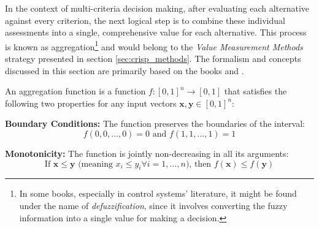 \label{sec:fuzzy_aggregation}









In the context of multi-criteria decision making, after evaluating each alternative against every criterion, the next logical step is to combine these individual assessments into a single, comprehensive value for each alternative. This process is known as aggregation\footnote{In some books, especially in control systems' literature, it might be found under the name of \textit{defuzzification}, since it involves converting the fuzzy information into a single value for making a decision.} and would belong to the \emph{Value Measurement Methods} strategy presented in section \ref{sec:crisp_methods}. The formalism and concepts discussed in this section are primarily based on the books \cite{beliakov2023discrete} and \cite{xu2015uncertain}.

\begin{definition} \label{def:aggregation_function}
An aggregation function is a function $f: [0, 1]^n \to [0, 1]$ that satisfies the following two properties for any input vectors $\mathbf{x}, \mathbf{y} \in [0, 1]^n$:
\begin{romanenum}
    \item \textbf{Boundary Conditions:} The function preserves the boundaries of the interval:
    \[f(0, 0, \dots, 0) = 0\text{ and }f(1, 1, \dots, 1) = 1\]
    \item \textbf{Monotonicity:} The function is jointly non-decreasing in all its arguments:
    \[\text{If }\mathbf{x} \le \mathbf{y}\text{ (meaning }x_i \le y_i \forall i=1, \dots, n\text{), then }f(\mathbf{x}) \le f(\mathbf{y})\]
\end{romanenum}
\end{definition}

